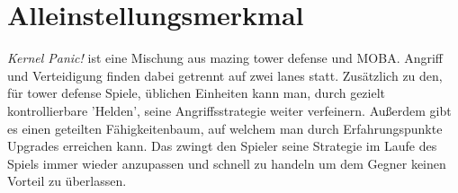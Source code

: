 \section{Alleinstellungsmerkmal}


\textit{Kernel Panic!} ist eine Mischung aus mazing tower defense und MOBA.
Angriff und Verteidigung finden dabei getrennt auf zwei lanes statt.
Zusätzlich zu den, für tower defense Spiele, üblichen Einheiten kann man, durch gezielt kontrollierbare 'Helden', seine Angriffsstrategie weiter verfeinern.
Außerdem gibt es einen geteilten Fähigkeitenbaum, auf welchem man durch Erfahrungspunkte Upgrades erreichen kann. Das zwingt den Spieler seine Strategie im Laufe des Spiels immer wieder anzupassen und schnell zu handeln um dem Gegner keinen Vorteil zu überlassen.
